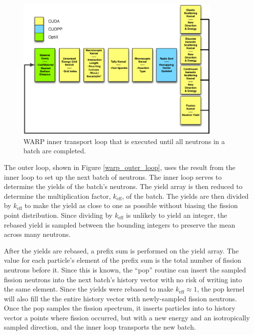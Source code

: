 \begin{figure}[h!] 
\centering
\includegraphics[width=0.9\textwidth]{graphics/warp_inner_loop.eps}
\caption{WARP inner transport loop that is executed until all neutrons in a batch are completed. \label{warp_inner_loop} }
\end{figure}

The outer loop, shown in Figure \ref{warp_outer_loop}, uses the result from the inner loop to set up the next batch of neutrons.  The inner loop serves to determine the yields of the batch's neutrons.  The yield array is then reduced to determine the multiplication factor, $k_\mathrm{eff}$, of the batch. The yields are then divided by $k_\mathrm{eff}$ to make the yield as close to one as possible without biasing the fission point distribution.  Since dividing by $k_\mathrm{eff}$ is unlikely to yield an integer, the rebased yield is sampled between the bounding integers to preserve the mean across many neutrons.  
 
After the yields are rebased, a prefix sum %
 is performed on the yield array.  The value for each particle's element of the prefix sum is the total number of fission neutrons before it.  Since this is known, the ``pop'' routine can insert the sampled fission neutrons into the next batch's history vector with no risk of writing into the same element.  Since the yields were rebased to make $k_\mathrm{eff}\approx1$, the pop kernel will also fill the the entire history vector with newly-sampled fission neutrons.  Once the pop samples the fission spectrum, it inserts particles into to history vector a points where fission occurred, but with a new energy and an isotropically sampled direction, and the inner loop transports the new batch. %

